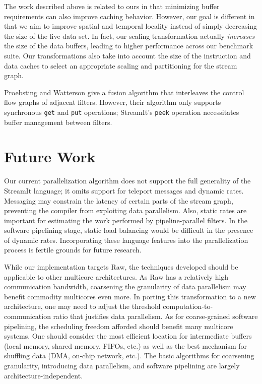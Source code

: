 The work described above is related to ours in that minimizing buffer
requirements can also improve caching behavior.  However, our goal is
different in that we aim to improve spatial and temporal locality
instead of simply decreasing the size of the live data set.  In fact,
our scaling transformation actually {\it increases} the size of the
data buffers, leading to higher performance across our benchmark
suite.  Our transformations also take into account the size of the
instruction and data caches to select an appropriate scaling and
partitioning for the stream graph.

Proebsting and Watterson \cite{pro96} give a fusion algorithm that
interleaves the control flow graphs of adjacent filters.  However,
their algorithm only supports synchronous {\tt get} and {\tt put}
operations; StreamIt's {\tt peek} operation necessitates buffer
management between filters.

\section{Future Work}

Our current parallelization algorithm does not support the full
generality of the StreamIt language; it omits support for teleport
messages and dynamic rates.  Messaging may constrain the latency of
certain parts of the stream graph, preventing the compiler from
exploiting data parallelism.  Also, static rates are important for
estimating the work performed by pipeline-parallel filters.  In the
software pipelining stage, static load balancing would be difficult in
the presence of dynamic rates.  Incorporating these language features
into the parallelization process is fertile grounds for future
research.

While our implementation targets Raw, the techniques developed should
be applicable to other multicore architectures.  As Raw has a
relatively high communication bandwidth, coarsening the granularity of
data parallelism may benefit commodity multicores even more.  In
porting this transformation to a new architecture, one may need to
adjust the threshold computation-to-communication ratio that justifies
data parallelism.  As for coarse-grained software pipelining, the
scheduling freedom afforded should benefit many multicore systems.
One should consider the most efficient location for intermediate
buffers (local memory, shared memory, FIFOs, etc.) as well as the best
mechanism for shuffling data (DMA, on-chip network, etc.).  The basic
algorithms for coarsening granularity, introducing data parallelism,
and software pipelining are largely architecture-independent.

